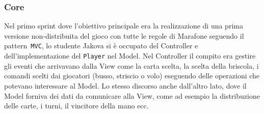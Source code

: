  \subsubsection{Core}\label{subsub:jakova:core}
    Nel primo sprint dove l’obiettivo principale era la realizzazione di una prima versione non-distribuita del gioco con tutte le regole di Marafone seguendo il pattern\texttt{ MVC}, lo studente Jakova si è occupato del Controller e dell’implementazione del \texttt{Player} nel Model. Nel Controller il compito era gestire gli eventi che arrivavano dalla View come la carta scelta, la scelta della briscola, i comandi scelti dai giocatori (busso, striscio o volo) eseguendo delle operazioni che potevano interessare al Model. Lo stesso discorso anche dall’altro lato, dove il Model forniva dei dati da comunicare alla View, come ad esempio la distribuzione delle carte, i turni, il vincitore della mano ecc. 

